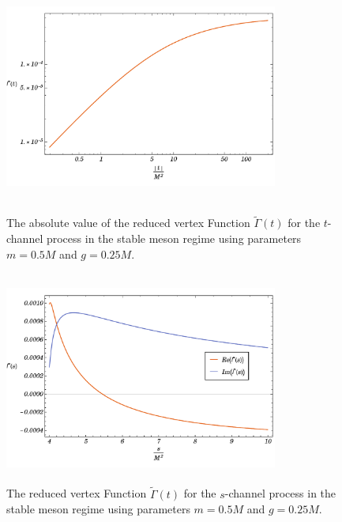 \documentclass{article}
\begin{document}
\begin{figure}[!htb]
    \centering
    \begin{minipage}[b]{.45\textwidth}
        \centering
        \includegraphics[width=9cm, height=7cm]	{Gamma-t-channel}
        \caption{The absolute value of the reduced vertex Function $\tilde{\Gamma}(t)$ for the $t$-channel process in the stable meson regime using parameters $m = 0.5M$ and $g = 0.25M$.}
        \label{fig:gamma1}
    \end{minipage}%
    \hfill
    \begin{minipage}[b]{0.45\textwidth}
        \centering
        \includegraphics[width=9cm, height=7cm]{Gamma-s-channel}
        \caption{The reduced vertex Function $\tilde{\Gamma}(t)$ for the $s$-channel process in the stable meson regime using parameters $m = 0.5M$ and $g = 0.25M$.}
        \label{fig:gamma1}
    \end{minipage}
\end{figure}
\end{document}
